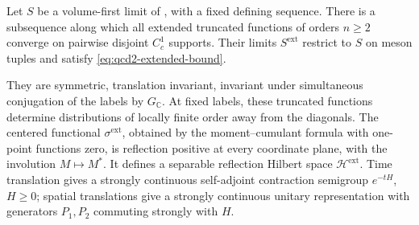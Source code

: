 \documentclass[11pt,letterpaper,reqno]{amsart}
\makeatletter
\theoremstyle{definition}
\newcommand{\ms@minorstart}{%
  \pushQED{\qed}\renewcommand{\qedsymbol}{$\blacksquare$}}
\newenvironment{proposition}[1][]{\ms@minorstart\ms@proposition[#1]}
  {\popQED\endms@proposition}
\theoremstyle{remark}
\makeatother
\begin{document}
\begin{proposition}[The enlarged limits]\label{C-401-49}
Let $S$ be a volume-first limit of \cite{QCDM1}, with a
fixed defining sequence. There is a subsequence along
which all extended truncated functions of orders $n\ge2$ converge on
pairwise disjoint $C_c^1$ supports. Their limits
$S^{\mathrm{ext}}$ restrict to $S$ on meson tuples and
satisfy \eqref{eq:qcd2-extended-bound}.

They are symmetric, translation invariant, invariant
under simultaneous conjugation of the labels by
$G_{\mathbb C}$.
At fixed labels, these truncated functions determine
distributions of locally finite order away from the diagonals.
The centered functional $\sigma^{\mathrm{ext}}$, obtained
by the moment--cumulant formula with one-point functions
zero, is reflection positive at every coordinate plane,
with the involution $M\mapsto M^*$. It defines a separable reflection Hilbert space
$\mathcal H^{\mathrm{ext}}$. Time translation gives a
strongly continuous self-adjoint contraction semigroup
$e^{-tH}$, $H\ge0$; spatial translations give a strongly
continuous unitary representation with generators
$P_1,P_2$ commuting strongly with $H$.
\end{proposition}
\end{document}
